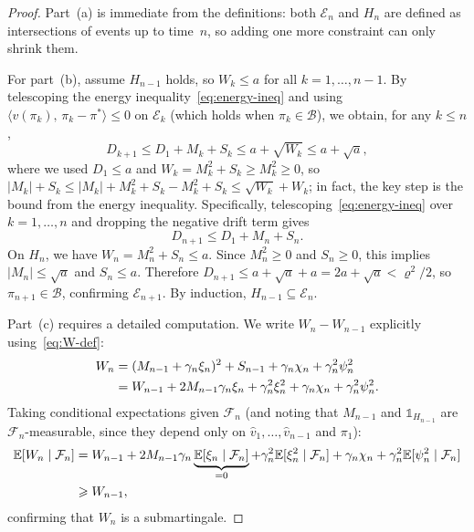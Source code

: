 \documentclass[a4paper,oneside,11pt]{report}
\newcommand{\ind}{\mathds{1}}
\newcommand{\calF}{\mathcal{F}}
\newcommand{\calB}{\mathcal{B}}
\newcommand{\calE}{\mathcal{E}}
\newcommand{\ip}[2]{\langle #1,\, #2 \rangle}
\numberwithin{theorem}{chapter}
\numberwithin{equation}{chapter}
\begin{document}
\begin{proof}
  Part~(a) is immediate from the definitions: both
  $\calE_n$ and $H_n$ are defined as intersections of events up to
  time~$n$, so adding one more constraint can only shrink them.

  For part~(b), assume $H_{n-1}$ holds, so $W_k \le a$ for all
  $k = 1, \ldots, n-1$. By telescoping the energy
  inequality~\eqref{eq:energy-ineq} and using
  $\ip{v(\pi_k)}{\pi_k - \pi^*} \le 0$ on $\calE_k$ (which holds when
  $\pi_k \in \calB$), we obtain, for any $k \le n$,
  \begin{equation}
    D_{k+1} \le D_1 + M_k + S_k
    \le a + \sqrt{W_k}
    \le a + \sqrt{a},
    \label{eq:D-bound-induction}
  \end{equation}
  where we used $D_1 \le a$ and
  $W_k = M_k^2 + S_k \ge M_k^2 \ge 0$, so
  $|M_k| + S_k \le |M_k| + M_k^2 + S_k - M_k^2 + S_k
  \le \sqrt{W_k} + W_k$; in fact, the key step is the bound from the
  energy inequality. Specifically, telescoping~\eqref{eq:energy-ineq}
  over $k = 1, \ldots, n$ and dropping the negative drift term gives
  \begin{equation}
    D_{n+1} \le D_1 + M_n + S_n.
    \label{eq:D-telescope}
  \end{equation}
  On $H_n$, we have $W_n = M_n^2 + S_n \le a$. Since $M_n^2 \ge 0$
  and $S_n \ge 0$, this implies $|M_n| \le \sqrt{a}$ and $S_n \le a$.
  Therefore
  $D_{n+1} \le a + \sqrt{a} + a = 2a + \sqrt{a} < \varrho^2/2$, so
  $\pi_{n+1} \in \calB$, confirming $\calE_{n+1}$. By induction,
  $H_{n-1} \subseteq \calE_n$.

  Part~(c) requires a detailed computation.
  We write $W_n - W_{n-1}$ explicitly using~\eqref{eq:W-def}:
  \begin{align}
    W_n &= (M_{n-1} + \gamma_n \xi_n)^2 + S_{n-1}
    + \gamma_n \chi_n + \gamma_n^2 \psi_n^2 \notag\\
    &= W_{n-1} + 2M_{n-1}\gamma_n \xi_n + \gamma_n^2 \xi_n^2
    + \gamma_n\chi_n + \gamma_n^2 \psi_n^2.
    \label{eq:W-increment}
  \end{align}
  Taking conditional expectations given $\calF_n$ (and noting that
  $M_{n-1}$ and $\ind_{H_{n-1}}$ are $\calF_n$-measurable, since they
  depend only on $\hat v_1, \ldots, \hat v_{n-1}$ and $\pi_1$):
  \begin{align}
    \E[W_n \mid \calF_n]
    &= W_{n-1} + 2M_{n-1}\gamma_n
    \underbrace{\E[\xi_n \mid \calF_n]}_{= 0}
    + \gamma_n^2 \E[\xi_n^2 \mid \calF_n]
    + \gamma_n\chi_n + \gamma_n^2 \E[\psi_n^2 \mid \calF_n]
    \notag \\
    &\ge W_{n-1},
    \label{eq:W-submart-check}
  \end{align}
  confirming that $W_n$ is a submartingale.


\end{proof}
\end{document}

